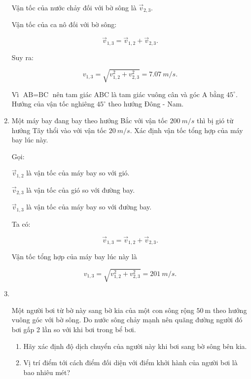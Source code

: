 \begin{enumerate}[label=\bfseries Bài \arabic*:]
{		Vận tốc của nước chảy đối với bờ sông là $\vec v_{2,3}$. 
		
		Vận tốc của ca nô đối với bờ sông:
		
		$$\vec v_{1,3} = \vec v_{1,2} + \vec v_{2,3}.$$
		
		Suy ra:
		
		$$v_{1,3} = \sqrt{ v_{1,2}^2 + v_{2,3}^2} = \SI{7,07}{m/s}.$$
		
		Vì $\text{AB} = \text{BC}$ nên tam giác ABC là tam giác vuông cân và góc A bằng $45^\circ$. Hướng của vận tốc nghiêng $45^\circ$ theo hướng Đông - Nam.
	}
	\item {}
	
	
	{
		Một máy bay đang bay theo hướng Bắc với vận tốc $\SI{200}{m/s}$ thì bị gió từ hướng Tây thổi vào với vận tốc $\SI{20}{m/s}$. Xác định vận tốc tổng hợp của máy bay lúc này.
	}
	\hideall
	{
		Gọi:
		
		$\vec v_{1,2}$ là vận tốc của máy bay so với gió.
		
		$\vec v_{2,3}$ là vận tốc của gió so với đường bay.
		
		$\vec v_{1,3}$ là vận tốc của máy bay so với đường bay.
		
		Ta có:
		
		$$\vec v_{1,3} = \vec v_{1,2} + \vec v_{2,3}.$$
		
		Vận tốc tổng hợp của máy bay lúc này là
		
		$$v_{1,3} = \sqrt{v_{1,2}^2 + v^2_{2,3}} = \SI{201}{m/s}.$$
	}
		

\item {}\\
{Một người bơi từ bờ này sang bờ kia của một con sông rộng $\SI{50}{\meter}$ theo hướng vuông góc với bờ sông. Do nước sông chảy mạnh nên quãng đường người đó bơi gấp 2 lần so với khi bơi trong bể bơi.
	\begin{enumerate}[label=\alph*)]
		\item Hãy xác định độ dịch chuyển của người này khi bơi sang bờ sông bên kia.
		\item Vị trí điểm tới cách điểm đối diện với điểm khởi hành của người bơi là bao nhiêu mét?
	\end{enumerate}
	
}


\end{enumerate}
